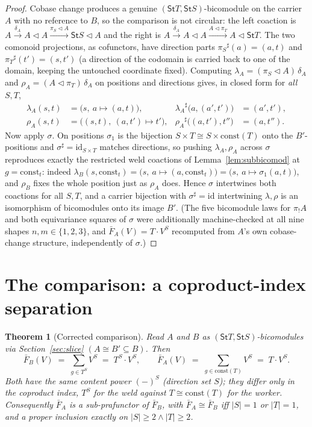 \documentclass[11pt]{article}
\newcommand{\comp}{\mathbin{\triangleleft}}       %
\newcommand{\St}{\mathsf{St}}                      %
\newcommand{\bk}[1]{{#1}^{\sharp}}                 %
\newcommand{\const}{\mathrm{const}}
\theoremstyle{plain}
\newtheorem{theorem}{Theorem}
\theoremstyle{definition}
\theoremstyle{remark}
\begin{document}
\begin{proof}
Cobase change produces a genuine $(\St T,\St S)$-bicomodule on the carrier $A$ with no
reference to $B$, so the comparison is not circular: the left coaction is
$A\xrightarrow{\delta_A}A\comp A\xrightarrow{\pi_S\comp A}\St S\comp A$ and the right is
$A\xrightarrow{\delta_A}A\comp A\xrightarrow{A\comp\pi_T}A\comp\St T$. The two comonoid
projections, as cofunctors, have direction parts $\bk{\pi_S}(a)=(a,t)$ and
$\bk{\pi_T}(t')=(s,t')$ (a direction of the codomain is carried back to one of the domain,
keeping the untouched coordinate fixed). Computing $\lambda_A=(\pi_S\comp A)\,\delta_A$ and
$\rho_A=(A\comp\pi_T)\,\delta_A$ on positions and directions gives, in closed form for
\emph{all} $S,T$,
\[
  \begin{aligned}
    \lambda_A(s,t)&=\bigl(s,\ a\mapsto(a,t)\bigr), & \bk{\lambda_A}\bigl(a,(a',t')\bigr)&=(a',t'),\\
    \rho_A(s,t)&=\bigl((s,t),\ (a,t')\mapsto t'\bigr), & \bk{\rho_A}\bigl((a,t'),t''\bigr)&=(a,t'').
  \end{aligned}
\]
Now apply $\sigma$. On positions $\sigma_1$ is the bijection $S\times T\cong S\times\const(T)$
onto the $B'$-positions and $\bk\sigma=\mathrm{id}_{S\times T}$ matches directions, so pushing
$\lambda_A,\rho_A$ across $\sigma$ reproduces exactly the restricted weld coactions of
Lemma~\ref{lem:subbicomod} at $g=\const_t$: indeed $\lambda_B(s,\const_t)=\bigl(s,\ a\mapsto
(a,\const_t)\bigr)=\bigl(s,\ a\mapsto\sigma_1(a,t)\bigr)$, and $\rho_B$ fixes the whole
position just as $\rho_A$ does. Hence $\sigma$ intertwines both coactions for all $S,T$, and a
carrier bijection with $\bk\sigma=\mathrm{id}$ intertwining $\lambda,\rho$ is an isomorphism
of bicomodules onto its image $B'$. (The five bicomodule laws for $\pi_!A$ and both
equivariance squares of $\sigma$ were additionally machine-checked at all nine shapes
$n,m\in\{1,2,3\}$, and $\bar F_A(V)=T\cdot V^S$ recomputed from $A$'s own cobase-change
structure, independently of $\sigma$.)
\end{proof}

\section{The comparison: a coproduct-index separation}\label{sec:compare}

\begin{theorem}[Corrected comparison]\label{thm:compare}
Read $A$ and $B$ as $(\St T,\St S)$-bicomodules via Section~\ref{sec:slice}
$(A\cong B'\subseteq B)$. Then
\[
  \bar F_B(V)\;=\;\sum_{g\in T^S} V^S \;=\; T^S\cdot V^S,
  \qquad
  \bar F_A(V)\;=\;\sum_{g\in\const(T)} V^S \;=\; T\cdot V^S .
\]
Both have the \emph{same} content power $(-)^S$ (direction set $S$); they differ
\emph{only} in the coproduct index, $T^S$ for the weld against $T\cong\const(T)$ for the
worker. Consequently $\bar F_A$ is a sub-prafunctor of $\bar F_B$, with
$\bar F_A\cong\bar F_B$ \emph{iff $|S|=1$ or $|T|=1$}, and a \emph{proper} inclusion
exactly on $|S|\ge2\wedge|T|\ge2$.
\end{theorem}
\end{document}
